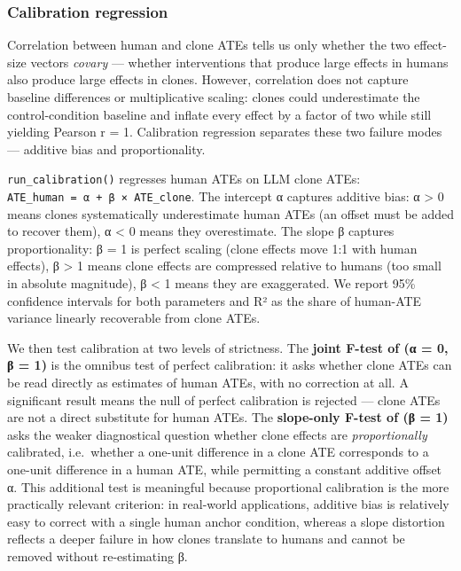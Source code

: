 \documentclass[
  letterpaper,
  DIV=11,
  numbers=noendperiod]{scrartcl}
\begin{document}
\subsubsection{Calibration regression}\label{calibration-regression}

Correlation between human and clone ATEs tells us only whether the two
effect-size vectors \emph{covary} --- whether interventions that produce
large effects in humans also produce large effects in clones. However,
correlation does not capture baseline differences or multiplicative
scaling: clones could underestimate the control-condition baseline and
inflate every effect by a factor of two while still yielding Pearson r =
1. Calibration regression separates these two failure modes --- additive
bias and proportionality.

\texttt{run\_calibration()} regresses human ATEs on LLM clone ATEs:
\texttt{ATE\_human\ =\ α\ +\ β\ ×\ ATE\_clone}. The intercept α captures
additive bias: α \textgreater{} 0 means clones systematically
underestimate human ATEs (an offset must be added to recover them), α
\textless{} 0 means they overestimate. The slope β captures
proportionality: β = 1 is perfect scaling (clone effects move 1:1 with
human effects), β \textgreater{} 1 means clone effects are compressed
relative to humans (too small in absolute magnitude), β \textless{} 1
means they are exaggerated. We report 95\% confidence intervals for both
parameters and R² as the share of human-ATE variance linearly
recoverable from clone ATEs.

We then test calibration at two levels of strictness. The \textbf{joint
F-test of (α = 0, β = 1)} is the omnibus test of perfect calibration: it
asks whether clone ATEs can be read directly as estimates of human ATEs,
with no correction at all. A significant result means the null of
perfect calibration is rejected --- clone ATEs are not a direct
substitute for human ATEs. The \textbf{slope-only F-test of (β = 1)}
asks the weaker diagnostical question whether clone effects are
\emph{proportionally} calibrated, i.e.~whether a one-unit difference in
a clone ATE corresponds to a one-unit difference in a human ATE, while
permitting a constant additive offset α. This additional test is
meaningful because proportional calibration is the more practically
relevant criterion: in real-world applications, additive bias is
relatively easy to correct with a single human anchor condition, whereas
a slope distortion reflects a deeper failure in how clones translate to
humans and cannot be removed without re-estimating β.
\end{document}
